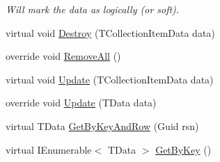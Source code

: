 \begin{DoxyCompactItemize}
\begin{DoxyCompactList}\small\item\em Will mark the {\itshape data}  as logically (or soft). \end{DoxyCompactList}\item 
virtual void \hyperlink{classCqrs_1_1Azure_1_1BlobStorage_1_1TableStorageStore_a0b408504b9553b9c649b7186a382052a_a0b408504b9553b9c649b7186a382052a}{Destroy} (T\+Collection\+Item\+Data data)
\item 
override void \hyperlink{classCqrs_1_1Azure_1_1BlobStorage_1_1TableStorageStore_aadd66b35bfa105ef4446bd791e99a3d5_aadd66b35bfa105ef4446bd791e99a3d5}{Remove\+All} ()
\item 
virtual void \hyperlink{classCqrs_1_1Azure_1_1BlobStorage_1_1TableStorageStore_aacb673aed5c6f828917f4d2e8c2ff75b_aacb673aed5c6f828917f4d2e8c2ff75b}{Update} (T\+Collection\+Item\+Data data)
\item 
override void \hyperlink{classCqrs_1_1Azure_1_1BlobStorage_1_1TableStorageStore_a869eba77358b10fc298f8e13fb21d628_a869eba77358b10fc298f8e13fb21d628}{Update} (T\+Data data)
\item 
virtual T\+Data \hyperlink{classCqrs_1_1Azure_1_1BlobStorage_1_1TableStorageStore_ab7c4ae1a7b13e6bd1c36c242b753edba_ab7c4ae1a7b13e6bd1c36c242b753edba}{Get\+By\+Key\+And\+Row} (Guid rsn)
\item 
virtual I\+Enumerable$<$ T\+Data $>$ \hyperlink{classCqrs_1_1Azure_1_1BlobStorage_1_1TableStorageStore_a7a6e253d7d4f6d40a2b59e804f68c5c4_a7a6e253d7d4f6d40a2b59e804f68c5c4}{Get\+By\+Key} ()
\end{DoxyCompactItemize}
